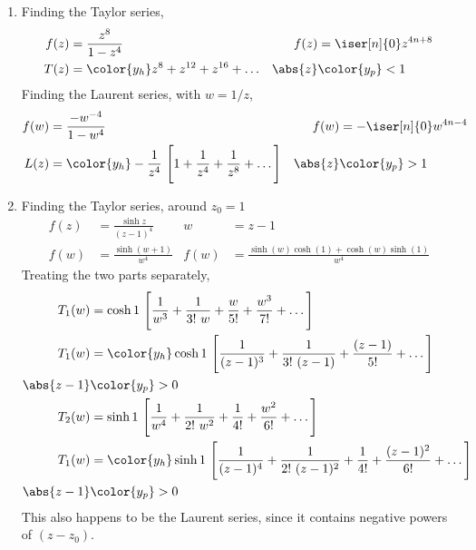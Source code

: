 \begin{enumerate}
    \item Finding the Taylor series,
          \begin{align}
              f(z)    & = \frac{z^8}{1-z^4}                         &
              f(z)    & = \iser[n]{0} z^{4n + 8}                      \\
              T(z)    & = \color{y_h} z^8 + z^{12} + z^{16} + \dots &
              \abs{z} & \color{y_p} < 1
          \end{align}
          Finding the Laurent series, with $ w = 1/z $,
          \begin{align}
              f(w)    & = \frac{-w^{-4}}{1 - w^4}                              &
              f(w)    & = -\iser[n]{0} w^{4n - 4}                                \\
              L(z)    & = \color{y_h} -\frac{1}{z^4}\ \Bigg[ 1 + \frac{1}{z^4}
                  + \frac{1}{z^8} + \dots
              \Bigg]  &
              \abs{z} & \color{y_p} > 1
          \end{align}

    \item Finding the Taylor series, around $ z_0 = 1 $
          \begin{align}
              f(z) & = \frac{\sinh z}{(z - 1)^4}                       &
              w    & = z - 1                                             \\
              f(w) & = \frac{\sinh(w + 1)}{w^4}                        &
              f(w) & = \frac{\sinh(w)\cosh(1) + \cosh(w)\sinh(1)}{w^4}
          \end{align}
          Treating the two parts separately,
          \begin{align}
              T_1(w)      & = \cosh 1\ \Bigg[ \frac{1}{w^3} + \frac{1}{3!\ w}
              + \frac{w}{5!} + \frac{w^3}{7!} + \dots \Bigg]                    \\
              T_1(w)      & = \color{y_h} \cosh 1\ \Bigg[ \frac{1}{(z-1)^3}
              + \frac{1}{3!\ (z-1)} + \frac{(z-1)}{5!} + \dots \Bigg]           \\
              \abs{z - 1} & \color{y_p} > 0                                     \\
              T_2(w)      & = \sinh 1\ \Bigg[ \frac{1}{w^4} + \frac{1}{2!\ w^2}
              + \frac{1}{4!} + \frac{w^2}{6!} + \dots \Bigg]                    \\
              T_1(w)      & = \color{y_h} \sinh 1\ \Bigg[ \frac{1}{(z-1)^4}
                  + \frac{1}{2!\ (z-1)^2} + \frac{1}{4!} + \frac{(z-1)^2}{6!}
              + \dots \Bigg]                                                    \\
              \abs{z - 1} & \color{y_p} > 0
          \end{align}
          This also happens to be the Laurent series, since it contains negative
          powers of $ (z - z_0) $.


\end{enumerate}
